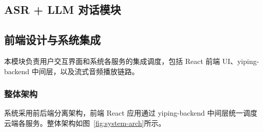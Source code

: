 \documentclass[12pt,a4paper]{article}
\begin{document}
\subsection{ASR + LLM 对话模块}
\label{sec:asr-llm}

%
%

\subsection{前端设计与系统集成}
\label{sec:frontend}

本模块负责用户交互界面和系统各服务的集成调度，包括 React 前端 UI、yiping-backend 中间层，以及流式音频播放链路。

\subsubsection{整体架构}

系统采用前后端分离架构，前端 React 应用通过 yiping-backend 中间层统一调度云端各服务。整体架构如图~\ref{fig:system-arch}所示。
\end{document}
